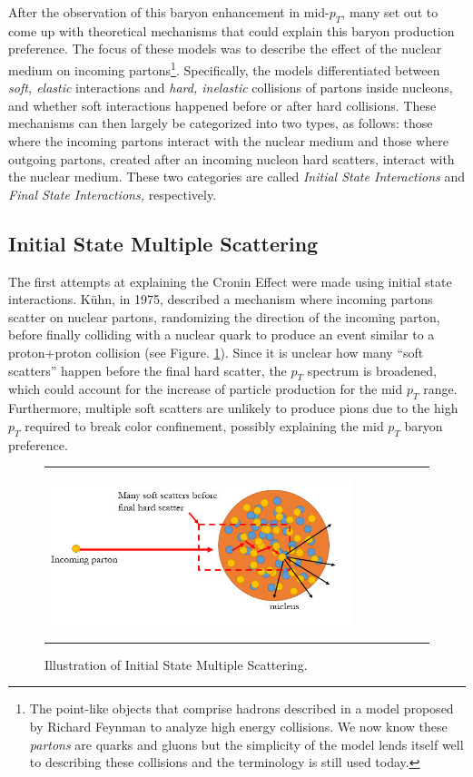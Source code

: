 After the observation of this baryon enhancement in mid-$p_T$, many set out to come up with theoretical mechanisms that could explain this baryon production preference. The focus of these models was to describe the effect of the nuclear medium on incoming partons\footnote{The point-like objects that comprise hadrons described in a model proposed by Richard Feynman to analyze high energy collisions. We now know these \textit{partons} are quarks and gluons but the simplicity of the model lends itself well to describing these collisions and the terminology is still used today.}. Specifically, the models differentiated between \textit{soft, elastic} interactions and \textit{hard, inelastic} collisions of partons inside nucleons, and whether soft interactions happened before or after hard collisions. These mechanisms can then largely be categorized into two types, as follows: those where the incoming partons interact with the nuclear medium and those where outgoing partons, created after an incoming nucleon hard scatters, interact with the nuclear medium. These two categories are called \textit{Initial State Interactions} and \textit{Final State Interactions,} respectively.

\subsection{Initial State Multiple Scattering}
The first attempts at explaining the Cronin Effect were made using initial state interactions. K\"{u}hn, in 1975, described a mechanism where incoming partons scatter on nuclear partons, randomizing the direction of the incoming parton, before finally colliding with a nuclear quark to produce an event similar to a proton+proton collision \citep{PhysRevD.13.2948} (see Figure. \ref{fig:ISIscattering}). Since it is unclear how many ``soft scatters'' happen before the final hard scatter, the $p_{T}$ spectrum is broadened, which could account for the increase of particle production for the mid $p_{T}$ range. Furthermore, multiple soft scatters are unlikely to produce pions due to the high $p_T$ required to break color confinement, possibly explaining the mid $p_T$ baryon preference.
\begin{figure}[htbp!]
  \centering    \rule{35em}{0.5pt}
    \includegraphics[width=0.8\textwidth]{Figures/ISIscattering.jpg}

  \caption[Illustration of Initial State Multiple Scattering]{Illustration of Initial State Multiple Scattering.}
  \label{fig:ISIscattering}    \rule{35em}{0.5pt}
\end{figure} 

